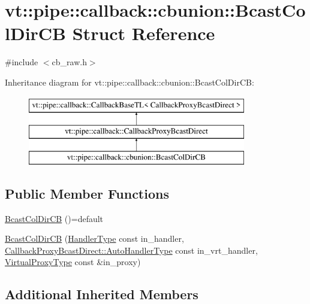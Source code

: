 \hypertarget{structvt_1_1pipe_1_1callback_1_1cbunion_1_1_bcast_col_dir_c_b}{}\section{vt\+:\+:pipe\+:\+:callback\+:\+:cbunion\+:\+:Bcast\+Col\+Dir\+CB Struct Reference}
\label{structvt_1_1pipe_1_1callback_1_1cbunion_1_1_bcast_col_dir_c_b}


{\ttfamily \#include $<$cb\+\_\+raw.\+h$>$}

Inheritance diagram for vt\+:\+:pipe\+:\+:callback\+:\+:cbunion\+:\+:Bcast\+Col\+Dir\+CB\+:\begin{figure}[H]
\begin{center}
\leavevmode
\includegraphics[height=3.000000cm]{structvt_1_1pipe_1_1callback_1_1cbunion_1_1_bcast_col_dir_c_b}
\end{center}
\end{figure}
\subsection*{Public Member Functions}
\begin{DoxyCompactItemize}
\item 
\hyperlink{structvt_1_1pipe_1_1callback_1_1cbunion_1_1_bcast_col_dir_c_b_a38d5f3f68d4ca7752835cae912d4f3a7}{Bcast\+Col\+Dir\+CB} ()=default
\item 
\hyperlink{structvt_1_1pipe_1_1callback_1_1cbunion_1_1_bcast_col_dir_c_b_a08e4af70634c11290b65670e8e294e77}{Bcast\+Col\+Dir\+CB} (\hyperlink{namespacevt_af64846b57dfcaf104da3ef6967917573}{Handler\+Type} const in\+\_\+handler, \hyperlink{structvt_1_1pipe_1_1callback_1_1_callback_proxy_bcast_direct_a543cd86434430bd048952534f4fbc128}{Callback\+Proxy\+Bcast\+Direct\+::\+Auto\+Handler\+Type} const in\+\_\+vrt\+\_\+handler, \hyperlink{namespacevt_a1b417dd5d684f045bb58a0ede70045ac}{Virtual\+Proxy\+Type} const \&in\+\_\+proxy)
\end{DoxyCompactItemize}
\subsection*{Additional Inherited Members}


